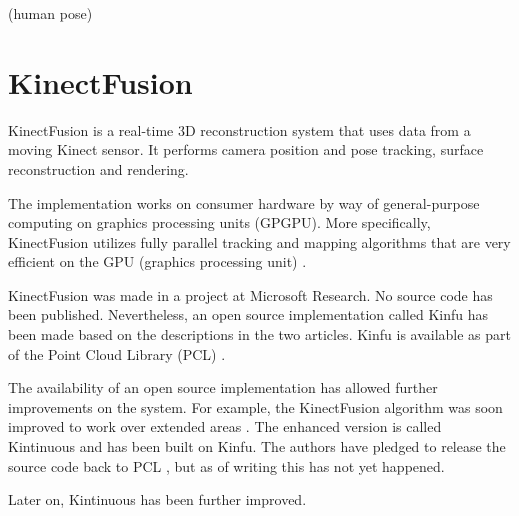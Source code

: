 
(human pose)
\citep{baak2011data}

\section{KinectFusion}

KinectFusion is a real-time 3D reconstruction system that uses data from a moving Kinect sensor. It performs camera position and pose tracking, surface reconstruction and rendering. \citep{izadi2011kinectfusion}

The implementation works on consumer hardware by way of general-purpose computing on graphics processing units (GPGPU). More specifically, KinectFusion utilizes fully parallel tracking and mapping algorithms that are very efficient on the GPU (graphics processing unit) \citep{newcombe2011kinectfusion}.



KinectFusion was made in a project at Microsoft Research. No source code has been published. Nevertheless, an open source implementation called Kinfu has been made based on the descriptions in the two articles. Kinfu is available as part of the Point Cloud Library (PCL) \citep{PCL}.

The availability of an open source implementation has allowed further improvements on the system. For example, the KinectFusion algorithm was soon improved to work over extended areas \citep{Whelan12rssw}. The enhanced version is called Kintinuous and has been built on Kinfu. The authors have pledged to release the source code back to PCL , but as of writing this has not yet happened.


Later on, Kintinuous has been further improved. 
\citep{Whelan12tr}

